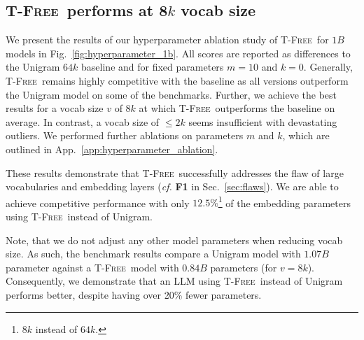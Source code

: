 \documentclass[11pt]{article}
\newcommand\todo[1]{\textcolor{red}{#1}}
\newcommand{\method}{\textsc{T-Free}}
\begin{document}
\subsection{\method\ performs at 8$k$ vocab size}
We present the results of our hyperparameter ablation study of \method\ for $1B$ models in Fig.~\ref{fig:hyperparameter_1b}. All scores are reported as differences to the Unigram $64k$ baseline and for fixed parameters $m=10$ and $k=0$. 
Generally, \method~remains highly competitive with the baseline as all versions outperform the Unigram model on some of the benchmarks. Further, we achieve the best results for a vocab size $v$ of $8k$ at which \method~outperforms the baseline on average. 
In contrast, a vocab size of $\leq 2k$ seems insufficient with devastating outliers.
We performed further ablations on parameters $m$ and $k$, which are outlined in App.~\ref{app:hyperparameter_ablation}. 

These results demonstrate that \method\ successfully addresses the flaw of large vocabularies and embedding layers (\emph{cf.} \textbf{F1} in Sec.~\ref{sec:flaws}).  
We are able to achieve competitive performance with only $12.5\%$\footnote{$8k$ instead of $64k$.} of the embedding parameters  using \method~instead of Unigram. 

Note, that we do not adjust any other model parameters when reducing vocab size. 
As such, the benchmark results compare a Unigram model with $1.07B$ parameter against a \method\ model with $0.84B$ parameters (for $v=8k$). 
 Consequently, we demonstrate that an LLM using \method~instead of Unigram performs better, despite having over 20\% fewer parameters.


\end{document}
